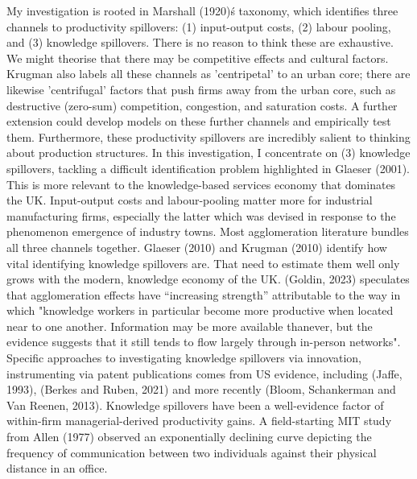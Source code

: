 My investigation is rooted in Marshall (1920)\'s taxonomy, which identifies three channels to productivity spillovers: (1) input-output costs,
(2) labour pooling, and (3) knowledge spillovers.
There is no reason to think these are exhaustive. We might theorise that there may be competitive effects and cultural factors.
Krugman also labels all these channels as 'centripetal' to an urban core; there are likewise 'centrifugal' factors that
push firms away from the urban core, such as destructive (zero-sum) competition, congestion, and saturation costs.
A further extension could develop models on these further channels and empirically test them.
Furthermore, these productivity spillovers are incredibly salient to thinking about production structures.
\newline
In this investigation, I concentrate on (3) knowledge spillovers, tackling a difficult identification problem highlighted in Glaeser (2001).
This is more relevant to the knowledge-based services economy that dominates the UK.
Input-output costs and labour-pooling matter more for industrial manufacturing firms, especially the latter which was devised in response to
the phenomenon emergence of industry towns.
\newline
Most agglomeration literature bundles all three channels together. Glaeser (2010) and Krugman (2010) identify how vital
identifying knowledge spillovers are. That need to estimate them well only grows with the modern, knowledge economy of the UK.
(Goldin, 2023) speculates that agglomeration effects have “increasing strength” attributable to the way in which
"knowledge workers in particular become more productive when located near to one another.
Information may be more available thanever, but the evidence suggests that it still tends to flow largely through in-person networks".
\newline
Specific approaches to investigating knowledge spillovers via innovation, instrumenting via patent publications comes from US evidence,
including (Jaffe, 1993), (Berkes and Ruben, 2021) and more recently (Bloom, Schankerman and Van Reenen, 2013).
\newline
Knowledge spillovers have been a well-evidence factor of within-firm managerial-derived productivity gains. A field-starting MIT study from Allen (1977) observed an exponentially declining curve depicting the frequency of communication between two individuals against their physical distance in an office.